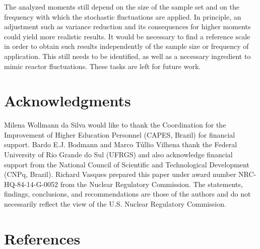 \documentclass[preprint,12pt,authoryear]{elsarticle}
\begin{document}
The analyzed moments still depend on the size of the sample set and on the frequency with which the stochastic fluctuations are applied.
In principle, an adjustment such as variance reduction and its consequences for higher moments could yield more realistic results.
It would be necessary to find a reference scale in order to obtain such results independently of the sample size or frequency of application.
This still needs to be identified, as well as a necessary ingredient to mimic reactor fluctuations.
These tasks are left for future work.
 
\section*{Acknowledgments}
Milena Wollmann da Silva would like to thank the Coordination for the Improvement of Higher Education Personnel (CAPES, Brazil) for financial support.
Bardo E.J. Bodmann and Marco T\'ullio Vilhena thank the Federal University of Rio Grande do Sul (UFRGS) and also acknowledge financial support from the National Council of Scientific and Technological Development (CNPq, Brazil).
Richard Vasques prepared this paper under award number NRC-HQ-84-14-G-0052 from the Nuclear Regulatory Commission.
The statements, findings, conclusions, and recommendations are those of the authors and do not necessarily reflect the view of the U.S. Nuclear Regulatory Commission.

\section*{References}



\pagebreak

\noindent
\end{document}
